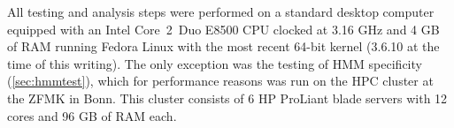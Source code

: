 All testing and analysis steps were performed on a standard desktop computer
equipped with an Intel \mbox{Core 2 Duo} E8500 CPU clocked at 3.16 GHz and 4 GB
of RAM running Fedora Linux with the most recent 64-bit kernel (3.6.10 at the
time of this writing). The only exception was the testing of HMM specificity
(\ref{sec:hmmtest}), which for performance reasons was run on the HPC cluster at
the ZFMK in Bonn. This cluster consists of 6 HP ProLiant blade servers with 12
cores and 96 GB of RAM each.
